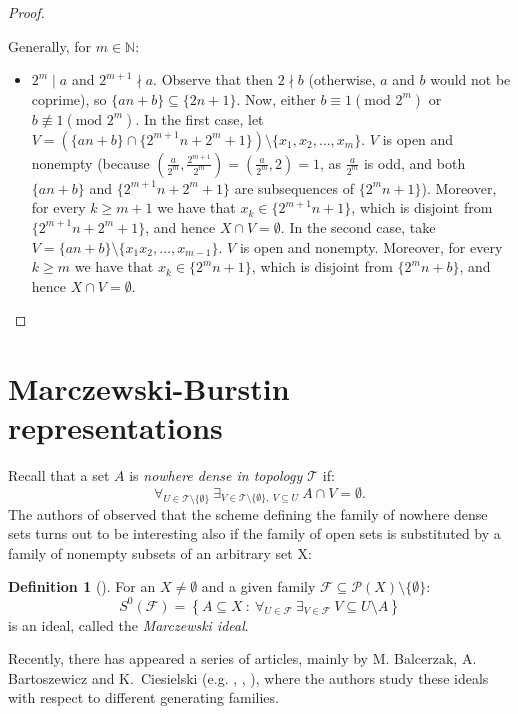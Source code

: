 \documentclass{amsart}
\theoremstyle{definition}
\newtheorem{df}{Definition}
\theoremstyle{definition}
\newcommand{\N}{{\mathbb N}}
\newcommand{\T}{\mathcal{T}}
\DeclareMathOperator{\Exists}{\exists}
\DeclareMathOperator{\Forall}{\forall}
\begin{document}
\begin{proof}
\begin{itemize}
\end{itemize}
Generally, for $m\in\N$:
\begin{itemize}
 \item $2^m\mid a$ and $2^{m+1}\nmid a$. Observe that then $2 \nmid b$ (otherwise, $a$ and $b$ would not be coprime), so $\{an+b\}\subseteq \{2n+1\}$. Now, either $b\equiv 1 (\textrm{mod } 2^m)$ or $b \not\equiv 1 (\textrm{mod } 2^m)$. In the first case, let $V = (\{an+b\} \cap \{2^{m+1}n+2^m+1\})\setminus\{x_1, x_2,\ldots, x_m\}$. $V$ is open and nonempty (because $(\frac{a}{2^m},\frac{2^{m+1}}{2^m})=(\frac{a}{2^m},2)=1$, as $\frac{a}{2^m}$ is odd, and both $\{an+b\}$ and $\{2^{m+1}n+2^m+1\}$ are subsequences of $\{2^m n+1\}$). Moreover, for every $k\geq m+1$ we have that $x_k\in \{2^{m+1}n+1\}$, which is disjoint from $\{2^{m+1}n+2^m+1\}$, and hence $X\cap V = \emptyset$. In the second case, take $V = \{an+b\} \setminus\{x_1x_2,\ldots, x_{m-1}\}$. $V$ is open and nonempty. Moreover, for every $k\geq m$ we have that $x_k\in \{2^m n+1\}$, which is disjoint from $\{2^m n+b\}$, and hence $X\cap V = \emptyset$.
\end{itemize}
\end{proof}


\section{Marczewski-Burstin representations}

Recall that a set $A$ is \emph{nowhere dense in topology $\T$} if:
$$\Forall_{U\in\T\setminus\{\emptyset\}}\ \Exists_{V\in\T\setminus\{\emptyset\},\ V\subseteq U}\ A\cap V = \emptyset.$$
The authors of \cite{MB} observed that the scheme defining the family of nowhere dense sets turns out to be interesting also if the family of open sets is substituted by a family of nonempty subsets of an arbitrary set X:
\begin{df}[\cite{MB}] For an $X\neq\emptyset$ and a given family $\mathcal{F}\subseteq \mathcal{P}(X)\setminus\{\emptyset\}$:
$$S^0(\mathcal{F}) = \left\{A\subseteq X\ :\ \Forall_{U\in\mathcal{F}}\ \Exists_{V\in\mathcal{F}}\ V\subseteq U\setminus A\right\}$$
is an ideal, called the \emph{Marczewski ideal}.
\end{df}

Recently, there has appeared a series of articles, mainly by M. Balcerzak, A. Bartoszewicz and K.~Ciesielski (e.g. \cite{MB}, \cite{MB2}, \cite{MB3}), where the authors study these ideals with respect to different generating families.
\end{document}
